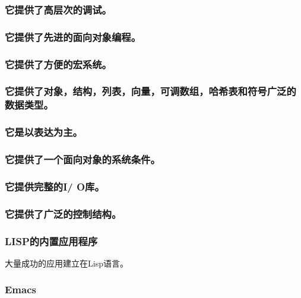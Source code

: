 \documentclass[11pt]{ctexart}
\begin{document}
{{{{\subsubsection{它提供了高层次的调试。}
\label{sec:org3d39c23}

\subsubsection{它提供了先进的面向对象编程。}
\label{sec:orge897e00}

\subsubsection{它提供了方便的宏系统。}
\label{sec:orgb089cca}

\subsubsection{它提供了对象，结构，列表，向量，可调数组，哈希表和符号广泛的数据类型。}
\label{sec:org7a69108}

\subsubsection{它是以表达为主。}
\label{sec:org280dc43}

\subsubsection{它提供了一个面向对象的系统条件。}
\label{sec:orgd9dcf63}

\subsubsection{它提供完整的I/ O库。}
\label{sec:org06a51ad}

\subsubsection{它提供了广泛的控制结构。}
\label{sec:org9135423}

\subsubsection{LISP的内置应用程序}
\label{sec:org06eb10d}

大量成功的应用建立在Lisp语言。

\subsubsection{Emacs}
\label{sec:org6cc55eb}

}}}}
\end{document}
